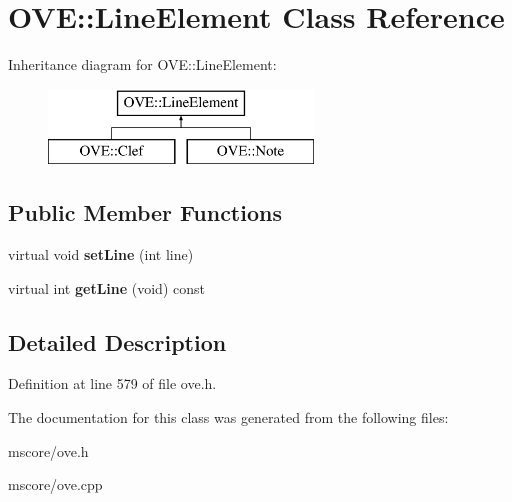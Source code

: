 \hypertarget{class_o_v_e_1_1_line_element}{}\section{O\+VE\+:\+:Line\+Element Class Reference}
\label{class_o_v_e_1_1_line_element}
Inheritance diagram for O\+VE\+:\+:Line\+Element\+:\begin{figure}[H]
\begin{center}
\leavevmode
\includegraphics[height=2.000000cm]{class_o_v_e_1_1_line_element}
\end{center}
\end{figure}
\subsection*{Public Member Functions}
\begin{DoxyCompactItemize}
\item 
\mbox{\label{class_o_v_e_1_1_line_element_aa8d7d8721e87c06de481351cfe032362}} 
virtual void {\bfseries set\+Line} (int line)
\item 
\mbox{\label{class_o_v_e_1_1_line_element_a2c6d7dc1bbe179c6ce6c19cb5395b549}} 
virtual int {\bfseries get\+Line} (void) const
\end{DoxyCompactItemize}


\subsection{Detailed Description}


Definition at line 579 of file ove.\+h.



The documentation for this class was generated from the following files\+:\begin{DoxyCompactItemize}
\item 
mscore/ove.\+h\item 
mscore/ove.\+cpp\end{DoxyCompactItemize}
